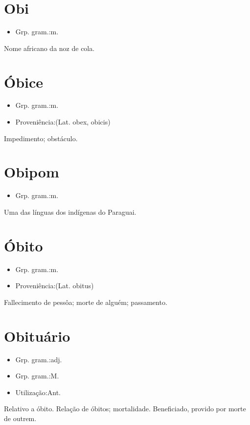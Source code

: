 \section{Obi}
\begin{itemize}
\item {Grp. gram.:m.}
\end{itemize}
Nome africano da noz de cola.
\section{Óbice}
\begin{itemize}
\item {Grp. gram.:m.}
\end{itemize}
\begin{itemize}
\item {Proveniência:(Lat. \textunderscore obex\textunderscore , \textunderscore obicis\textunderscore )}
\end{itemize}
Impedimento; obstáculo.
\section{Obipom}
\begin{itemize}
\item {Grp. gram.:m.}
\end{itemize}
Uma das línguas dos indígenas do Paraguai.
\section{Óbito}
\begin{itemize}
\item {Grp. gram.:m.}
\end{itemize}
\begin{itemize}
\item {Proveniência:(Lat. \textunderscore obitus\textunderscore )}
\end{itemize}
Fallecimento de pessôa; morte de alguém; passamento.
\section{Obituário}
\begin{itemize}
\item {Grp. gram.:adj.}
\end{itemize}
\begin{itemize}
\item {Grp. gram.:M.}
\end{itemize}
\begin{itemize}
\item {Utilização:Ant.}
\end{itemize}
Relativo a óbito.
Relação de óbitos; mortalidade.
Beneficiado, provido por morte de outrem.
